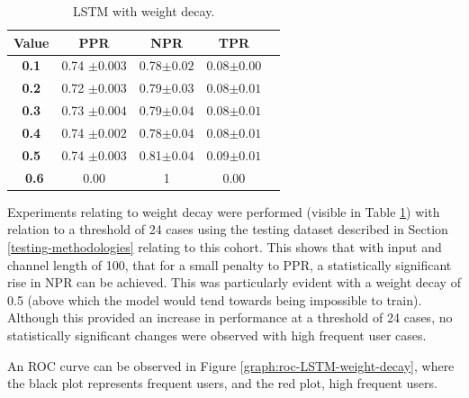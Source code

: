 \begin{table}[ht]
\setlength{\tabcolsep}{8pt}
\centering
\caption{LSTM with weight decay.}
\label{table:weight-decay}
\begin{tabular}{@{}c|cccc@{}}
\toprule
    Value         & PPR               & NPR   & TPR     \\ \midrule
\textbf{0.1} & 0.74 $\pm 0.003$  & 0.78$\pm 0.02$ & 0.08$\pm 0.00$ \\
\textbf{0.2} & 0.72  $\pm 0.003$ & 0.79$\pm 0.03$ & 0.08$\pm 0.01$  \\
\textbf{0.3} & 0.73  $\pm 0.004$ & 0.79$\pm 0.04$ & 0.08$\pm 0.01$ \\
\textbf{0.4} & 0.74  $\pm 0.002$ & 0.78$\pm 0.04$ & 0.08$\pm 0.01$   \\
\textbf{0.5} & 0.74  $\pm 0.003$ & 0.81$\pm 0.04$ & 0.09$\pm 0.01$  \\ \
\textbf{0.6} & 0.00                 & 1          & 0.00         \\ \bottomrule
\end{tabular}
\end{table}


Experiments relating to weight decay were performed (visible in Table \ref{table:weight-decay}) with relation to a threshold of 24 cases using the testing dataset described in Section \ref{testing-methodologies} relating to this cohort. This shows that with input and channel length of 100, that for a small penalty to PPR, a statistically significant rise in NPR can be achieved. This was particularly evident with a weight decay of 0.5 (above which the model would tend towards being impossible to train). Although this provided an increase in performance at a threshold of 24 cases, no statistically significant changes were observed with high frequent user cases.

An ROC curve can be observed in Figure \ref{graph:roc-LSTM-weight-decay}, where the black plot represents frequent users, and the red plot, high frequent users.



